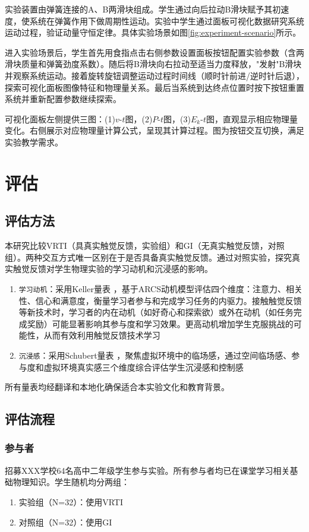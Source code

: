 \documentclass[runningheads]{llncs}
\begin{document}
实验装置由弹簧连接的A、B两滑块组成。学生通过向后拉动B滑块赋予其初速度，使系统在弹簧作用下做周期性运动。实验中学生通过面板可视化数据研究系统运动过程，验证动量守恒定律。具体实验场景如图\ref{fig:experiment-scenario}所示。

进入实验场景后，学生首先用食指点击右侧参数设置面板按钮配置实验参数（含两滑块质量和弹簧劲度系数）。随后将B滑块向右拉动至适当力度释放，"发射"B滑块并观察系统运动。接着旋转旋钮调整运动过程时间线（顺时针前进/逆时针后退），探索可视化面板图像特征和物理量关系。最后当系统到达终点位置时按下按钮重置系统并重新配置参数继续探索。

可视化面板左侧提供三图：(1)$v$-$t$图，(2)$P$-$t$图，(3)$E_k$-$t$图，直观显示相应物理量变化。右侧展示对应物理量计算公式，呈现其计算过程。图为按钮交互切换，满足实验教学需求。

\section{评估}


\subsection{评估方法}
本研究比较VRTI（具真实触觉反馈，实验组）和GI（无真实触觉反馈，对照组）。两种交互方式唯一区别在于是否具备真实触觉反馈。通过对照实验，探究真实触觉反馈对学生物理实验的学习动机和沉浸感的影响。

\begin{enumerate}
  \item {\texttt{学习动机}}：采用Keller量表 \cite{keller1983motivational}，基于ARCS动机模型评估四个维度：注意力、相关性、信心和满意度，衡量学习者参与和完成学习任务的内驱力。接触触觉反馈等新技术时，学习者的内在动机（如好奇心和探索欲）或外在动机（如任务完成奖励）可能显著影响其参与度和学习效果。更高动机增加学生克服挑战的可能性，从而有效利用触觉反馈技术学习
  \item {\texttt{沉浸感}}：采用Schubert量表 \cite{schubert2001experience}，聚焦虚拟环境中的临场感，通过空间临场感、参与度和虚拟环境真实感三个维度综合评估学生沉浸感和控制感
\end{enumerate}

所有量表均经翻译和本地化确保适合本实验文化和教育背景。

\subsection{评估流程}
\subsubsection{参与者}
招募XXX学校64名高中二年级学生参与实验。所有参与者均已在课堂学习相关基础物理知识。学生随机均分两组：
\begin{enumerate}
  \item 实验组（N=32）：使用VRTI
  \item 对照组（N=32）：使用GI
\end{enumerate}
\end{document}
